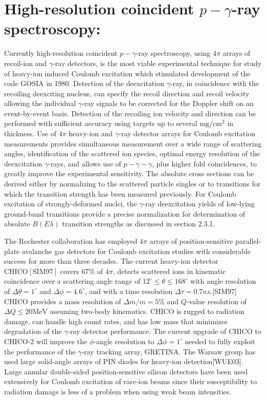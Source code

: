 \documentclass[10pt]{article}
\begin{document}
\section*{High-resolution coincident $p-\gamma$-ray spectroscopy:}
Currently high-resolution coincident $p-\gamma$-ray spectroscopy, using $4 \pi$ arrays of recoil-ion and $\gamma$-ray detectors, is the most viable experimental technique for study of heavy-ion induced Coulomb excitation which stimulated development of the code GOSIA in 1980. Detection of the deexcitation $\gamma$-ray, in coincidence with the recoiling deexciting nucleus, can specify the recoil direction and recoil velocity allowing the individual $\gamma$-ray signals to be corrected for the Doppler shift on an event-by-event basis. Detection of the recoiling ion velocity and direction can be performed with sufficient accuracy using targets up to several $\mathrm{mg} / \mathrm{cm}^{2}$ in thickness. Use of $4 \pi$ heavy-ion and $\gamma$-ray detector arrays for Coulomb excitation measurements provides simultaneous measurement over a wide range of scattering angles, identification of the scattered ion species, optimal energy resolution of the deexcitation $\gamma$-rays, and allows use of $p-\gamma-\gamma$, plus higher fold coincidences, to greatly improve the experimental sensitivity. The absolute cross sections can be derived either by normalizing to the scattered particle singles or to transitions for which the transition strength has been measured previously. For Coulomb excitation of strongly-deformed nuclei, the $\gamma$-ray deexcitation yields of low-lying ground-band transitions provide a precise normalization for determination of absolute $B(E \lambda)$ transition strengths as discussed in section 2.3.1.

The Rochester collaboration has employed $4 \pi$ arrays of position-sensitive parallel-plate avalanche gas detectors for Coulomb excitation studies with considerable success for more than three decades. The current heavy-ion detector $\mathrm{CHICO}[\mathrm{SIM} 97]$ covers $67 \%$ of $4 \pi$, detects scattered ions in kinematic coincidence over a scattering angle range of $12^{\circ} \leq \theta \leq 168^{\circ}$ with angle resolution of $\Delta \theta=1^{\circ}$ and $\Delta \phi=4.6^{\circ}$, and with a time resolution $\Delta \tau=0.7 n s$.[SIM97] CHICO provides a mass resolution of $\Delta m / m=5 \%$ and $Q$-value resolution of $\Delta Q \leq 20 \mathrm{MeV}$ assuming two-body kinematics. CHICO is rugged to radiation damage, can handle high count rates, and has low mass that minimizes degradation of the $\gamma$-ray detector performance. The current upgrade of CHICO to CHICO-2 will improve the $\phi$-angle resolution to $\Delta \phi=1^{\circ}$ needed to fully exploit the performance of the $\gamma$-ray tracking array, GRETINA. The Warsaw group has used large solid-angle arrays of PIN diodes for heavy-ion detection[WUE03]. Large annular double-sided position-sensitive silicon detectors have been used extensively for Coulomb excitation of rare-ion beams since their susceptibility to radiation damage is less of a problem when using weak beam intensities.
\end{document}
